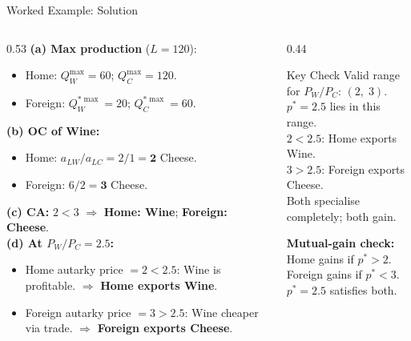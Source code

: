 \documentclass[aspectratio=169]{beamer}
\begin{document}
\begin{frame}{Worked Example: Solution}
\begin{columns}[T]
\begin{column}{0.53\textwidth}
\textbf{(a) Max production} ($L=120$):
\begin{itemize}\small
  \item Home: $Q_W^{\max}=60$; $Q_C^{\max}=120$.
  \item Foreign: $Q_W^{*\max}=20$; $Q_C^{*\max}=60$.
\end{itemize}
\textbf{(b) OC of Wine:}
\begin{itemize}\small
  \item Home: $a_{LW}/a_{LC}=2/1=\mathbf{2}$ Cheese.
  \item Foreign: $6/2=\mathbf{3}$ Cheese.
\end{itemize}
\textbf{(c) CA:}\; $2<3$
$\Rightarrow$ \textbf{Home: Wine};\;
\textbf{Foreign: Cheese}.\\[0.3em]
\textbf{(d) At $P_W/P_C=2.5$:}
\begin{itemize}\small
  \item Home autarky price $=2<2.5$: Wine is profitable.
        $\Rightarrow$ \textbf{Home exports Wine}.
  \item Foreign autarky price $=3>2.5$: Wine cheaper
        via trade.
        $\Rightarrow$ \textbf{Foreign exports Cheese}.
\end{itemize}
\end{column}
\begin{column}{0.44\textwidth}
\begin{insight}{Key Check}
\footnotesize Valid range for $P_W/P_C$: $(2,\;3)$.\\
$p^{*}=2.5$ lies in this range. \checkmark\\[0.3em]
$2<2.5$: Home exports Wine. \checkmark\\
$3>2.5$: Foreign exports Cheese. \checkmark\\[0.3em]
Both specialise completely; both gain.
\end{insight}
\vspace{0.4em}
\begin{varbox}
\footnotesize\textbf{Mutual-gain check:}\\[0.1em]
Home gains if $p^{*}>2$. \checkmark\\
Foreign gains if $p^{*}<3$. \checkmark\\
$p^{*}=2.5$ satisfies both. \checkmark
\end{varbox}
\end{column}
\end{columns}
\end{frame}
\end{document}
